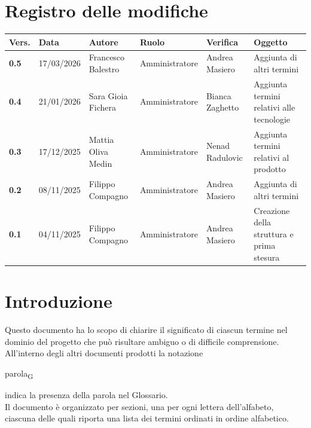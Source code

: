 \documentclass[a4paper,12pt]{article}
\begin{document}
    

        \newpage
        \section*{Registro delle modifiche} {
        \begin{table}[h!]
            \begin{tabularx}{\textwidth}{|l|l|l|l|L|L|}
                \hline
                \textbf{Vers.} & \textbf{Data} & \textbf{Autore} & \textbf{Ruolo} & \textbf{Verifica} & \textbf{Oggetto} \\
                \hline
                \textbf{0.5} & 17/03/2026 & Francesco Balestro & Amministratore & Andrea Masiero & Aggiunta di altri termini \\
                \hline
                \textbf{0.4} & 21/01/2026 & Sara Gioia Fichera & Amministratore & Bianca Zaghetto & Aggiunta termini relativi alle tecnologie \\
                \hline
                \textbf{0.3} & 17/12/2025 & Mattia Oliva Medin & Amministratore & Nenad Radulovic & Aggiunta termini relativi al prodotto \\
                \hline
                \textbf{0.2} & 08/11/2025 & Filippo Compagno & Amministratore & Andrea Masiero & Aggiunta di altri termini \\
                \hline
                \textbf{0.1} & 04/11/2025 & Filippo Compagno & Amministratore & Andrea Masiero & Creazione della struttura e prima stesura \\
                \hline
            \end{tabularx}
            \end{table}
        }
        \newpage

        \tableofcontents
        \newpage

        \section*{Introduzione} {
            Questo documento ha lo scopo di chiarire il significato di ciascun termine nel dominio del progetto che può risultare ambiguo o di difficile comprensione.\\
            All'interno degli altri documenti prodotti la notazione
            \begin{center}
                parola\textsubscript{G}
            \end{center}
            indica la presenza della parola nel Glossario.\\
            Il documento è organizzato per sezioni, una per ogni lettera dell'alfabeto, ciascuna delle quali riporta una lista dei termini ordinati in ordine alfabetico.
        }
        \newpage
\end{document}
